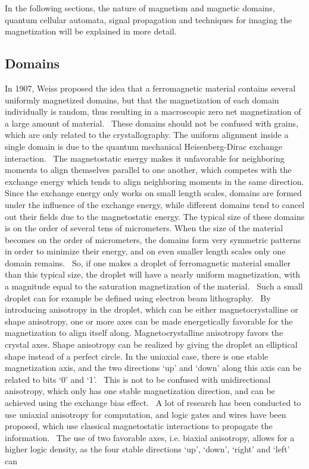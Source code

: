\documentclass[10pt,a4paper]{article}
\begin{document}
In the following sections, the nature of magnetism and magnetic domains, quantum cellular automata, signal propagation and techniques for imaging the magnetization will be explained in more detail.

\subsection{Domains}
In 1907, Weiss proposed the idea that a ferromagnetic material contains several uniformly magnetized domains, but that the magnetization of each domain individually is random, thus resulting in a macroscopic zero net magnetization of a large amount of material.~\cite{MuMax3_advances} These domains should not be confused with grains, which are only related to the crystallography. The uniform alignment inside a single domain is due to the quantum mechanical Heisenberg-Dirac exchange interaction.~\cite{MuMax3_advances, heisenberg1928theorie} The magnetostatic energy makes it unfavorable for neighboring moments to align themselves parallel to one another, which competes with the exchange energy which tends to align neighboring moments in the same direction. Since the exchange energy only works on small length scales, domains are formed under the influence of the exchange energy, while different domains tend to cancel out their fields due to the magnetostatic energy. The typical size of these domains is on the order of several tens of micrometers. When the size of the material becomes on the order of micrometers, the domains form very symmetric patterns in order to minimize their energy, and on even smaller length scales only one domain remains.~\cite{NML_Carlton} So, if one makes a droplet of ferromagnetic material smaller than this typical size, the droplet will have a nearly uniform magnetization, with a magnitude equal to the saturation magnetization of the material.~\cite{NML_Carlton} Such a small droplet can for example be defined using electron beam lithography.~\cite{MQCA_RoomTemp, NML_Carlton} By introducing anisotropy in the droplet, which can be either magnetocrystalline or shape anisotropy, one or more axes can be made energetically favorable for the magnetization to align itself along. Magnetocrystalline anisotropy favors the crystal axes. Shape anisotropy can be realized by giving the droplet an elliptical shape instead of a perfect circle. In the uniaxial case, there is one stable magnetization axis, and the two directions `up' and `down' along this axis can be related to bits `0' and `1'.~\cite{MQCA_RoomTemp} This is not to be confused with unidirectional anisotropy, which only has one stable magnetization direction, and can be achieved using the exchange bias effect.~\cite{ExchangeBias_Mechanisms,ExchangeBias_nanostructures,ExchangeBias} A lot of research has been conducted to use uniaxial anisotropy for computation, and logic gates and wires have been proposed, which use classical magnetostatic interactions to propagate the information.~\cite{GYP-18,MQCA_MajorityGate,SwitchingForced_EnergyEfficient} The use of two favorable axes, i.e. biaxial anisotropy, allows for a higher logic density, as the four stable directions `up', `down', `right' and `left' can 
\end{document}
